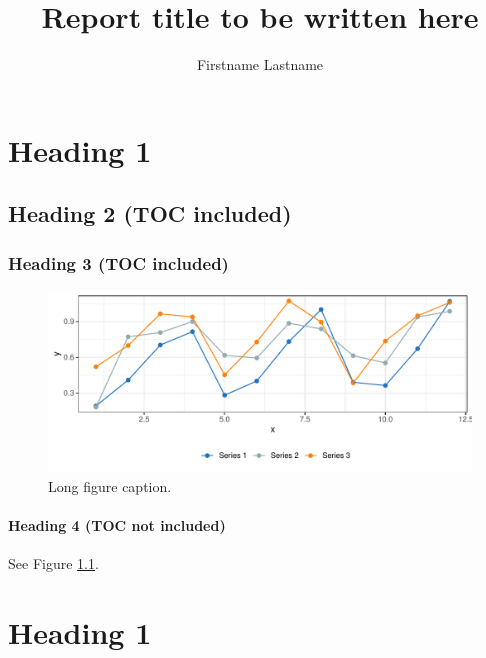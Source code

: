 \documentclass{lukereport}
\title{Report title to be written here}
\author{Firstname Lastname}
\begin{document}
\maketitle

\begin{abstract}
\lipsum[2-3]
\end{abstract}

\setcounter{page}{5}

\setcounter{tocdepth}{0}


\tableofcontents



\chapter{Heading 1}

\lipsum[1]

\section{Heading 2 (TOC included)}

\lipsum[2]

\subsection{Heading 3 (TOC included)}
\begin{figure}[!hb]
	\centering
	\includegraphics[width=.8\linewidth]{fig_ex1}
	\caption[short figure caption]{Long figure caption.}
	\label{fig:figex1}
\end{figure}

\lipsum[4]

\subsubsection{Heading 4 (TOC not included)}


\lipsum[6] See Figure \ref{fig:figex1}.


\chapter{Heading 1}
\end{document}
